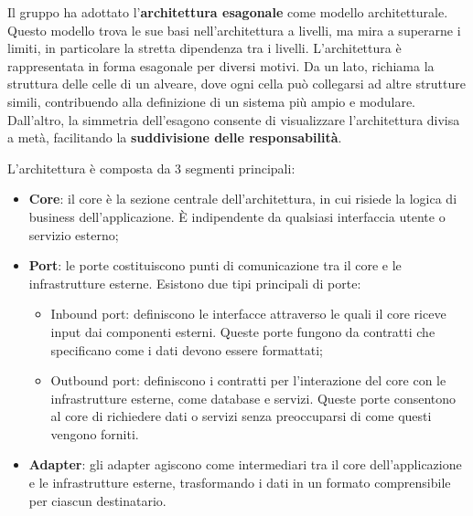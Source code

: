 \par Il gruppo ha adottato l'\textbf{architettura esagonale} come modello architetturale. Questo modello trova le sue basi nell'architettura a livelli, ma mira a superarne i limiti, in particolare la stretta dipendenza tra i livelli. L'architettura è rappresentata in forma esagonale per diversi motivi. Da un lato, richiama la struttura delle celle di un alveare, dove ogni cella può collegarsi ad altre strutture simili, contribuendo alla definizione di un sistema più ampio e modulare. Dall'altro, la simmetria dell'esagono consente di visualizzare l'architettura divisa a metà, facilitando la \textbf{suddivisione delle responsabilità}.
\par L'architettura è composta da 3 segmenti principali:
\begin{itemize}
    \item \textbf{Core}: il core è la sezione centrale dell'architettura, in cui risiede la logica di business dell'applicazione. È indipendente da qualsiasi interfaccia utente o servizio esterno;
    \item \textbf{Port}: le porte costituiscono punti di comunicazione tra il core e le infrastrutture esterne. Esistono due tipi principali di porte:
    \begin{itemize}
        \item Inbound port: definiscono le interfacce attraverso le quali il core riceve input dai componenti esterni. Queste porte fungono da contratti che specificano come i dati devono essere formattati;
        \item Outbound port: definiscono i contratti per l'interazione del core con le infrastrutture esterne, come database e servizi. Queste porte consentono al core di richiedere dati o servizi senza preoccuparsi di come questi vengono forniti. 
    \end{itemize}
    \item \textbf{Adapter}: gli adapter agiscono come intermediari tra il core dell'applicazione e le infrastrutture esterne, trasformando i dati in un formato comprensibile per ciascun destinatario.
\end{itemize}

